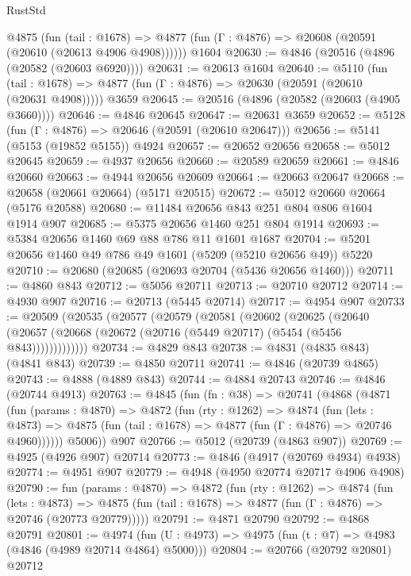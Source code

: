 \begin{lexlean}{RustStd}
\begin{coremodule}
    @4875
      (fun (tail : @1678) =>
      @4877 (fun (Γ : @4876) => @20608 (@20591 (@20610 (@20613 @4906 @4908))))))
    @1604
@20630 := @4846 (@20516 (@4896 (@20582 (@20603 @6920))))
@20631 := @20613 @1604
@20640 := @5110
    (fun (tail : @1678) => @4877 (fun (Γ : @4876) => @20630 (@20591 (@20610 (@20631 @4908)))))
    @3659
@20645 := @20516 (@4896 (@20582 (@20603 (@4905 @3660))))
@20646 := @4846 @20645
@20647 := @20631 @3659
@20652 := @5128 (fun (Γ : @4876) => @20646 (@20591 (@20610 @20647)))
@20656 := @5141 (@5153 (@19852 @5155)) @4924
@20657 := @20652 @20656
@20658 := @5012 @20645
@20659 := @4937 @20656
@20660 := @20589 @20659
@20661 := @4846 @20660
@20663 := @4944 @20656 @20609
@20664 := @20663 @20647
@20668 := @20658 (@20661 @20664) (@5171 @20515)
@20672 := @5012 @20660 @20664 (@5176 @20588)
@20680 := @11484 @20656 @843 @251 @804 @806 @1604 @1914 @907
@20685 := @5375 @20656 @1460 @251 @804 @1914
@20693 := @5384 @20656 @1460 @69 @88 @786 @11 @1601 @1687
@20704 := @5201 @20656 @1460 @49 @786 @49 @1601 (@5209 (@5210 @20656 @49)) @5220
@20710 := @20680 (@20685 (@20693 @20704 (@5436 @20656 @1460)))
@20711 := @4860 @843
@20712 := @5056 @20711
@20713 := @20710 @20712
@20714 := @4930 @907
@20716 := @20713 (@5445 @20714)
@20717 := @4954 @907
@20733 := @20509
    (@20535
      (@20577
        (@20579
          (@20581
            (@20602
              (@20625
                (@20640
                  (@20657 (@20668 (@20672 (@20716 (@5449 @20717) (@5454 (@5456 @843)))))))))))))
@20734 := @4829 @843
@20738 := @4831 (@4835 @843) (@4841 @843)
@20739 := @4850 @20711
@20741 := @4846 (@20739 @4865)
@20743 := @4888 (@4889 @843)
@20744 := @4884 @20743
@20746 := @4846 (@20744 @4913)
@20763 := @4845
    (fun (fn : @38) =>
    @20741
      (@4868
        (@4871
          (fun (params : @4870) =>
          @4872
            (fun (rty : @1262) =>
            @4874
              (fun (lets : @4873) =>
              @4875 (fun (tail : @1678) => @4877 (fun (Γ : @4876) => @20746 @4960))))))
        @5006))
    @907
@20766 := @5012 (@20739 (@4863 @907))
@20769 := @4925 (@4926 @907) @20714
@20773 := @4846 (@4917 (@20769 @4934) @4938)
@20774 := @4951 @907
@20779 := @4948 (@4950 @20774 @20717 @4906 @4908)
@20790 := fun (params : @4870) =>
  @4872
    (fun (rty : @1262) =>
    @4874
      (fun (lets : @4873) =>
      @4875 (fun (tail : @1678) => @4877 (fun (Γ : @4876) => @20746 (@20773 @20779)))))
@20791 := @4871 @20790
@20792 := @4868 @20791
@20801 := @4974
    (fun (U : @4973) => @4975 (fun (t : @7) => @4983 (@4846 (@4989 @20714 @4864) @5000)))
@20804 := @20766 (@20792 @20801) @20712

\end{coremodule}
\end{lexlean}
